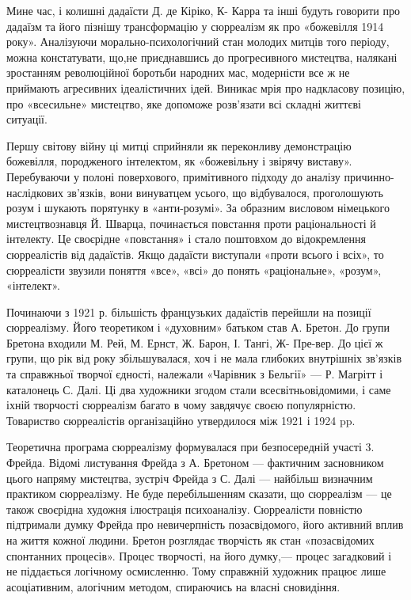 \documentclass[14pt]{extarticle} %
\begin{document}
Мине час, і колишні дадаїсти Д. де Кіріко, К- Карра та інші будуть говорити про дадаїзм та його пізнішу трансформацію у сюрреалізм як
про «божевілля 1914 року». Аналізуючи морально-психологічний стан молодих митців того періоду, можна констатувати, що,не приєднавшись
до прогресивного мистецтва, налякані зростанням революційної боротьби народних мас, модерністи все ж не приймають агресивних ідеалістичних ідей.
Виникає мрія про надкласову позицію, про «всесильне» мистецтво, яке допоможе розв'язати всі складні життєві ситуації.

Першу світову війну ці митці сприйняли як переконливу демонстрацію божевілля, породженого інтелектом, як «божевільну і звірячу виставу».
Перебуваючи у полоні поверхового, примітивного підходу до аналізу причинно-наслідкових зв'язків, вони винуватцем усього, що відбувалося,
проголошують розум і шукають порятунку в «анти-розумі». За образним висловом німецького мистецтвознавця Й. Шварца, починається повстання проти 
раціональності й інтелекту. Це своєрідне «повстання» і стало поштовхом до відокремлення сюрреалістів від дадаїстів. Якщо дадаїсти виступали
«проти всього і всіх», то сюрреалісти звузили поняття «все», «всі» до понять «раціональне», «розум», «інтелект».

Починаючи з 1921 р. більшість французьких дадаїстів перейшли на позиції сюрреалізму. Його теоретиком і «духовним» батьком став А. Бретон.
До групи Бретона входили М. Рей, М. Ернст, Ж. Барон, І. Тангі, Ж- Пре-вер. До цієї ж групи, що рік від року збільшувалася, хоч 
і не мала глибоких внутрішніх зв'язків та справжньої творчої єдності, належали «Чарівник з Бельгії» — Р. Магрітт і каталонець С. Далі.
Ці два художники згодом стали всесвітньовідомими, і саме іхній творчості сюрреалізм багато в чому завдячує своєю популярністю.
Товариство сюрреалістів організаційно утвердилося між 1921 і 1924 pp.

Теоретична програма сюрреалізму формувалася при безпосередній участі 3. Фрейда. Відомі листування Фрейда з А. Бретоном — фактичним
засновником цього напряму мистецтва, зустріч Фрейда з С. Далі — найбільш визначним практиком сюрреалізму. Не буде перебільшенням сказати, що 
сюрреалізм — це також своєрідна художня ілюстрація психоаналізу. Сюрреалісти повністю підтримали думку Фрейда про невичерпність позасвідомого, 
його активний вплив на життя кожної людини. Бретон розглядає творчість як стан «позасвідомих спонтанних процесів». Процес творчості, на його
думку,— процес загадковий і не піддається логічному осмисленню. Тому справжній художник працює лише асоціативним, алогічним методом, спираючись
на власні сновидіння.
\end{document}
